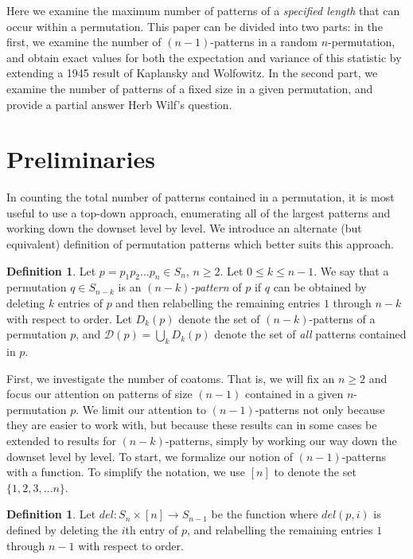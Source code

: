 \documentclass[11pt]{article}
\theoremstyle{plain}
\theoremstyle{definition}
\newtheorem{defn}[thm]{Definition}
\begin{document}
  Here we examine the maximum number of patterns of a \emph{specified length}
  that can occur within a permutation.  This paper can be divided into two
  parts: in the first, we examine the number of $(n-1)$-patterns in a random
  $n$-permutation, and obtain exact values for both the expectation and variance
  of this statistic by extending a 1945 result of Kaplansky and Wolfowitz. In
  the second part, we examine the number of patterns of a fixed size in a given
  permutation, and provide a partial answer Herb Wilf's question. 

\section{Preliminaries}
  


  In counting the total number of patterns contained in a permutation, it is
  most useful to use a top-down approach, enumerating all of the largest
  patterns and working down the downset level by level. We introduce an
  alternate (but equivalent) definition of permutation patterns which better
  suits this approach.

  \begin{defn} 
  Let $p = p_1p_2 \ldots p_n \in S_n$, $n\geq 2$. Let $0 \leq k \leq
  n-1$. We say that a permutation $q \in S_{n-k}$ is an \emph{$(n-k)$-pattern} of
  $p$ if $q$ can be obtained by deleting $k$ entries of $p$ and then relabelling
  the remaining entries $1$ through $n-k$ with respect to order. Let
  \emph{$D_k(p)$} denote the set of $(n-k)$-patterns of a permutation $p$, and
  $\mathcal{D}(p) = \bigcup_k D_k(p)$ denote the set of \emph{all} patterns
  contained in $p$.
  \end{defn}

  
  First, we investigate the number of coatoms. That is, we will fix an $n\geq 2$
  and focus our attention on patterns of size $(n-1)$ contained in a given
  $n$-permutation $p$. We limit our attention to $(n-1)$-patterns not only
  because they are easier to work with, but because these results can in some
  cases be extended to results for $(n-k)$-patterns, simply by working our way
  down the downset level by level. To start, we formalize our notion of
  $(n-1)$-patterns with a function.  To simplify the notation, we use $[n]$ to
  denote the set $\{1,2,3, \ldots n\}$. 

  \begin{defn} 
  Let $del: S_n\times [n] \rightarrow S_{n-1}$ be the function where
  $del(p,i)$ is defined by deleting the $i$th entry of $p$, and relabelling the
  remaining entries $1$ through $n-1$ with respect to order.  
  \end{defn} 
\end{document}
